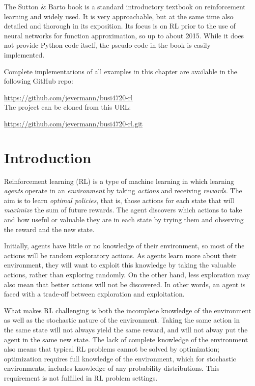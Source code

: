 The Sutton \& Barto book is a standard introductory textbook on reinforcement learning and widely used. It is very approachable, but at the same time also detailed and thorough in its exposition. Its focus is on RL prior to the use of neural networks for function approximation, so up to about 2015. While it does not provide Python code itself, the pseudo-code in the book is easily implemented.

\begin{withcode}
\begin{resourcebox}
Complete implementations of all examples in this chapter are available in the following GitHub repo:

\url{https://github.com/jevermann/busi4720-rl} \\

The project can be cloned from this URL:

\url{https://github.com/jevermann/busi4720-rl.git}
\end{resourcebox}
\end{withcode}

\section{Introduction}

Reinforcement learning (RL) is a type of machine learning in which learning \emph{agents} operate in an \emph{environment} by taking \emph{actions} and receiving \emph{rewards}. The aim is to learn \emph{optimal policies}, that is, those actions for each state that will \emph{maximize} the sum of future rewards. The agent discovers which actions to take and how useful or valuable they are in each state by trying them and observing the reward and the new state. 

Initially, agents have little or no knowledge of their environment, so most of the actions will be random exploratory actions. As agents learn more about their environment, they will want to exploit this knowledge by taking the valuable actions, rather than exploring randomly. On the other hand, less exploration may also mean that better actions will not be discovered. In other words, an agent is faced with a trade-off between exploration and exploitation.

What makes RL challenging is both the incomplete knowledge of the environment as well as the stochastic nature of the environment. Taking the same action in the same state will not always yield the same reward, and will not alway put the agent in the same new state. The lack of complete knowledge of the environment also means that typical RL problems cannot be solved by optimization; optimization requires full knowledge of the environment, which for stochastic environments, includes knowledge of any probability distributions. This requirement is not fulfilled in RL problem settings.

